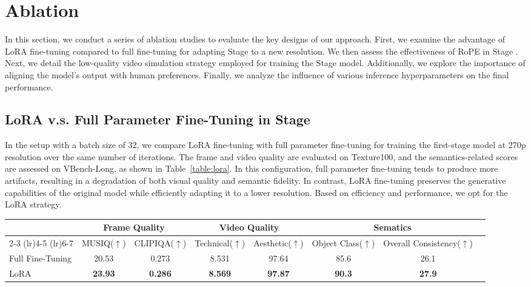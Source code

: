 \section{Ablation}


In this section, we conduct a series of ablation studies to evaluate the key designs of our approach. First, we examine the advantage of LoRA fine-tuning compared to full fine-tuning for adapting Stage  to a new resolution. We then assess the effectiveness of RoPE in Stage . Next, we detail the low-quality video simulation strategy employed for training the Stage  model. Additionally, we explore the importance of aligning the model's output with human preferences. Finally, we analyze the influence of various inference hyperparameters on the final performance.

\subsection{LoRA v.s. Full Parameter Fine-Tuning in Stage }

In the setup with a batch size of 32, we compare LoRA fine-tuning with full parameter fine-tuning for training the first-stage model at 270p resolution over the same number of iterations. The frame and video quality are evaluated on Texture100, and the semantics-related scores are assessed on VBench-Long, as shown in Table~\ref{table:lora}. In this configuration, full parameter fine-tuning tends to produce more artifacts, resulting in a degradation of both visual quality and semantic fidelity. In contrast, LoRA fine-tuning preserves the generative capabilities of the original model while efficiently adapting it to a lower resolution. Based on efficiency and performance, we opt for the LoRA strategy.


\begin{table*}[t]
\centering
\scriptsize
\setlength{\tabcolsep}{6pt}
\renewcommand{\arraystretch}{1.0}
\begin{tabular}{lccccccc}
\toprule
& \multicolumn{2}{c}{\textbf{Frame Quality}} & \multicolumn{2}{c}{\textbf{Video  Quality}} & \multicolumn{2}{c}{\textbf{Sematics}} \\
\cmidrule(lr){2-3}
\cmidrule(lr){4-5}
\cmidrule(lr){6-7}
 & MUSIQ($\uparrow$) & CLIPIQA($\uparrow$) & Technical($\uparrow$)   & Aesthetic($\uparrow$)  & Object Class($\uparrow$) & Overall Consistency($\uparrow$)   \\
\midrule
 Full Fine-Tuning & 20.53 & 0.273 & 8.531 & 97.64 & 85.6 & 26.1 \\
LoRA & \textbf{23.93} & \textbf{0.286} & \textbf{8.569} & \textbf{97.87} & 
\textbf{90.3} & \textbf{27.9}  \\
\bottomrule
\end{tabular}
\caption{Comparison of LoRA and full parameter fine-tuning in Stage . Best results  are in \textbf{bold}.}
\label{table:lora}
\end{table*}





